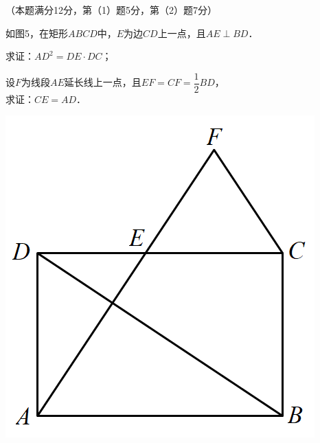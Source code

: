 \documentclass{article}
\begin{document}
\begin{question}[23]
    \item （本题满分12分，第（1）题5分，第（2）题7分）\\
    \begin{minipage}[t]{.58\textwidth}
        如图5，在矩形$ABCD$中，$E$为边$CD$上一点，且$AE\perp BD$．
        \begin{squestion}
            \item 求证：$AD^2=DE\cdot DC$；
            \item \vspace{0.1cm} 设$F$为线段$AE$延长线上一点，且$EF=CF=\dfrac{1}{2}BD$，\\[5pt]
                  求证：$CE=AD$．
        \end{squestion}
    \end{minipage}
    \begin{minipage}[t]{.42\textwidth}
        \centering
        \vspace{-2ex}
        \includegraphics[scale=0.3]{images/p5.png}
    \end{minipage}
\end{question} \leavevmode

\newpage

\rfoot{}
\cfoot{}
\end{document}
